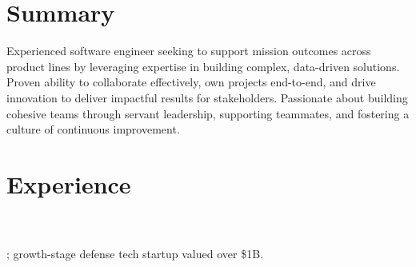 %
%
\sectionsep
\section{Summary}

\raggedright

Experienced software engineer seeking to support mission outcomes across product lines by leveraging expertise in building complex, data-driven solutions. Proven ability to collaborate effectively, own projects end-to-end, and drive innovation to deliver impactful results for stakeholders. Passionate about building cohesive teams through servant leadership, supporting teammates, and fostering a culture of continuous improvement.

\sectionsep

\section{Experience}
\\
\\
; growth-stage defense tech startup valued over \$1B.

